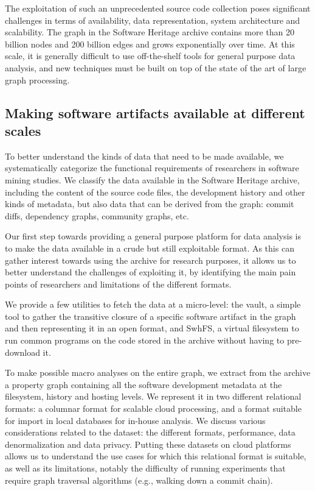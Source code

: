 The exploitation of such an unprecedented source code collection poses
significant challenges in terms of availability, data representation, system
architecture and scalability. The graph in the Software Heritage archive
contains more than 20 billion nodes and 200 billion edges and grows
exponentially over time. At this scale, it is generally difficult to use
off-the-shelf tools for general purpose data analysis, and new techniques must
be built on top of the state of the art of large graph processing.

\subsection*{Making software artifacts available at different scales}

To better understand the kinds of data that need to be made available, we
systematically categorize the functional requirements of researchers in
software mining studies.  We classify the data available in the Software
Heritage archive, including the content of the source code files, the
development history and other kinds of metadata, but also data that can be
derived from the graph: commit diffs, dependency graphs, community graphs, etc.

Our first step towards providing a general purpose platform for data analysis
is to make the data available in a crude but still exploitable format. As this
can gather interest towards using the archive for research purposes, it
allows us to better understand the challenges of exploiting it, by identifying
the main pain points of researchers and limitations of the different formats.

We provide a few utilities to fetch the data at a micro-level: the vault, a
simple tool to gather the transitive closure of a specific software artifact in
the graph and then representing it in an open format, and SwhFS, a virtual
filesystem to run common programs on the code stored in the archive without
having to pre-download it.

To make possible macro analyses on the entire graph, we extract from the
archive a property graph containing all the software development metadata at
the filesystem, history and hosting levels. We represent it in two different
relational formats: a columnar format for scalable cloud processing, and a
format suitable for import in local databases for in-house analysis. We discuss
various considerations related to the dataset: the different formats,
performance, data denormalization and data privacy.
Putting these datasets on cloud platforms allows us to understand the use cases
for which this relational format is suitable, as well as its limitations,
notably the difficulty of running experiments that require graph traversal
algorithms (e.g., walking down a commit chain).

